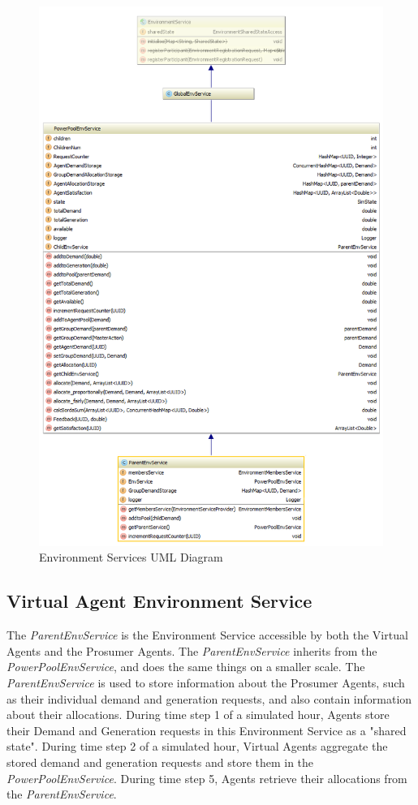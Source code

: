 \begin{figure}[!h]
	\centering
	\includegraphics[scale=0.5]{Images/EnvironmentUML-2.png}
	\caption{Environment Services UML Diagram}
	\label{fig:ServiceUML2}
\end{figure}

\subsection*{Virtual Agent Environment Service}
The \textit{ParentEnvService} is the Environment Service accessible by both the Virtual Agents and the Prosumer Agents. The \textit{ParentEnvService} inherits from the \textit{PowerPoolEnvService}, and does the same things on a smaller scale. The \textit{ParentEnvService} is used to store information about the Prosumer Agents, such as their individual demand and generation requests, and also contain information about their allocations. During time step 1 of a simulated hour, Agents store their Demand and Generation requests in this Environment Service as a "shared state". During time step 2 of a simulated hour, Virtual Agents aggregate the stored demand and generation requests and store them in the \textit{PowerPoolEnvService}. During time step 5, Agents retrieve their allocations from the \textit{ParentEnvService}.

